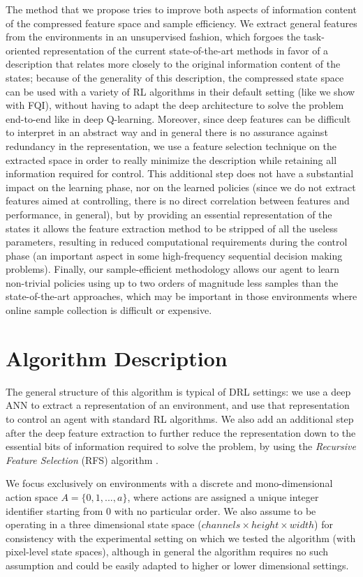 The method that we propose tries to improve both aspects of information content
of the compressed feature space and sample efficiency. We extract general 
features from the environments in an unsupervised fashion, which forgoes the
task-oriented representation of the current state-of-the-art methods in favor of
a description that relates more closely to the original information content of 
the states; because of the generality of this description, the compressed state 
space can be used with a variety of RL algorithms in their default setting (like
we show with FQI), without having to adapt the deep architecture to solve the 
problem end-to-end like in deep Q-learning.
Moreover, since deep features can be difficult to interpret in an abstract 
way and in general there is no assurance against redundancy in the 
representation, we use a feature selection technique on the extracted space in 
order to really minimize the description while retaining all information 
required for control. 
This additional step does not have a substantial impact on the learning phase, 
nor on the learned policies (since we do not extract features aimed at 
controlling, there is no direct correlation between features and performance, in
general), but by providing an essential representation of the states it allows
the feature extraction method to be stripped of all the useless parameters, 
resulting in reduced computational requirements during the control phase (an 
important aspect in some high-frequency sequential decision making problems).
Finally, our sample-efficient methodology allows our agent to learn non-trivial 
policies using up to two orders of magnitude less samples than the 
state-of-the-art approaches, which may be important in those environments where 
online sample collection is difficult or expensive.

\section{Algorithm Description}
The general structure of this algorithm is typical of DRL settings: we use a 
deep ANN to extract a representation of an environment, and use that 
representation to control an agent with standard RL algorithms. We also add an 
additional step after the deep feature extraction to further reduce the 
representation down to the essential bits of information required to solve the 
problem, by using the \textit{Recursive Feature Selection} (RFS) algorithm 
\cite{castelletti2011tree}.

We focus exclusively on environments with a discrete and mono-dimensional 
action space $A = \{0, 1, ..., a\}$, where actions are assigned a unique integer 
identifier starting from $0$ with no particular order. 
We also assume to be operating in a three dimensional state space 
($channels \times height \times width$) for consistency with the experimental 
setting on which we tested the algorithm (with pixel-level state spaces), 
although in general the algorithm requires no such assumption and could be 
easily adapted to higher or lower dimensional settings. 

